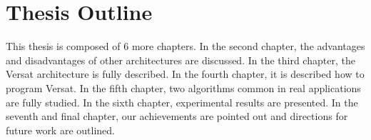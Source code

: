 \section{Thesis Outline}
\label{section:outline}

This thesis is composed of 6 more chapters. In the second chapter, the
advantages and disadvantages of other architectures are discussed. In
the third chapter, the Versat architecture is fully described. In the
fourth chapter, it is described how to program Versat. In the fifth
chapter, two algorithms common in real applications are fully
studied. In the sixth chapter, experimental results are presented. In
the seventh and final chapter, our achievements are pointed out and
directions for future work are outlined.

